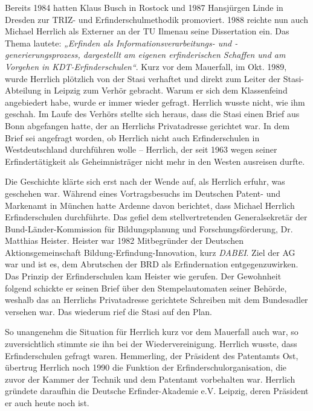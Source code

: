 \documentclass[11pt,a4paper]{article}
\begin{document}
Bereits 1984 hatten Klaus Busch in Rostock und 1987 Hansjürgen Linde in
Dresden zur TRIZ- und Erfinderschulmethodik promoviert. 1988 reichte nun auch
Michael Herrlich als Externer an der TU Ilmenau seine Dissertation ein. Das
Thema lautete: \emph{„Erfinden als Informationsver\-arbeitungs- und
  -generierungsprozess, dargestellt am eigenen erfinderischen Schaffen und am
  Vorgehen in KDT-Erfinderschulen“}. Kurz vor dem Mauerfall, im Okt. 1989,
wurde Herrlich plötzlich von der Stasi verhaftet und direkt zum Leiter der
Stasi-Abteilung in Leipzig zum Verhör gebracht. Warum er sich dem Klassenfeind
angebiedert habe, wurde er immer wieder gefragt. Herrlich wusste nicht, wie
ihm geschah. Im Laufe des Verhörs stellte sich heraus, dass die Stasi einen
Brief aus Bonn abgefangen hatte, der an Herrlichs Privatadresse gerichtet
war. In dem Brief sei angefragt worden, ob Herrlich nicht auch Erfinderschulen
in Westdeutschland durchführen wolle – Herrlich, der seit 1963 wegen seiner
Erfindertätigkeit als Geheimnisträger nicht mehr in den Westen ausreisen
durfte.

Die Geschichte klärte sich erst nach der Wende auf, als Herrlich erfuhr, was
geschehen war. Während eines Vortragsbesuchs im Deutschen Patent- und
Markenamt in München hatte Ardenne davon berichtet, dass Michael Herrlich
Erfinderschulen durchführte. Das gefiel dem stellvertretenden Generalsekretär
der Bund-Länder-Kommission für Bildungsplanung und Forschungsförderung,
Dr. Matthias Heister. Heister war 1982 Mitbegründer der Deutschen
Aktionsgemeinschaft Bildung-Erfindung-Innovation, kurz \emph{DABEI}. Ziel der
AG war und ist es, dem Abrutschen der BRD als Erfindernation
entgegenzuwirken. Das Prinzip der Erfinderschulen kam Heister wie gerufen. Der
Gewohnheit folgend schickte er seinen Brief über den Stempelautomaten seiner
Behörde, weshalb das an Herrlichs Privatadresse gerichtete Schreiben mit dem
Bundesadler versehen war. Das wiederum rief die Stasi auf den Plan.

So unangenehm die Situation für Herrlich kurz vor dem Mauerfall auch war, so
zuversichtlich stimmte sie ihn bei der Wiedervereinigung. Herrlich wusste,
dass Erfinderschulen gefragt waren. Hemmerling, der Präsident des Patentamts
Ost, übertrug Herrlich noch 1990 die Funktion der Erfinderschulorganisation,
die zuvor der Kammer der Technik und dem Patentamt vorbehalten war. Herrlich
gründete daraufhin die Deutsche Erfinder-Akademie e.V. Leipzig, deren
Präsident er auch heute noch ist.
\end{document}
